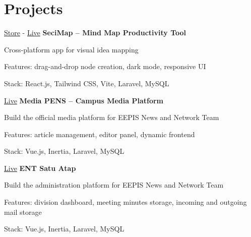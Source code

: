 \section{Projects}

\begin{twocolentrylink}{
		\href{https://play.google.com/store/apps/details?id=com.mindmap.mindmap&pcampaignid=web_share}{Store}
		-
		\href{https://secimap.agileteknik.com/}{Live}
	}
	\textbf{SeciMap -- Mind Map Productivity Tool}
\end{twocolentrylink}
\begin{onecolentry}
	\begin{highlights}
		\item Cross-platform app for visual idea mapping
		\item Features: drag-and-drop node creation, dark mode, responsive UI
		\item Stack: React.js, Tailwind CSS, Vite, Laravel, MySQL
	\end{highlights}
\end{onecolentry}

\vspace{0.3 cm}


\begin{twocolentrylink}{
		\href{https://media.ent.pens.ac.id}{Live}
	}
	\textbf{Media PENS -- Campus Media Platform}
\end{twocolentrylink}
\begin{onecolentry}
	\begin{highlights}
		\item Build the official media platform for EEPIS News and Network Team
		\item Features: article management, editor panel, dynamic frontend
		\item Stack: Vue.js, Inertia, Laravel, MySQL
	\end{highlights}
\end{onecolentry}

\vspace{0.3 cm}


\begin{twocolentrylink}{
		\href{https://ent.pens.ac.id}{Live}
	}
	\textbf{ENT Satu Atap}
\end{twocolentrylink}
\begin{onecolentry}
	\begin{highlights}
		\item Build the administration platform for EEPIS News and Network Team
		\item Features: division dashboard, meeting minutes storage, incoming and outgoing mail storage
		\item Stack: Vue.js, Inertia, Laravel, MySQL
	\end{highlights}
\end{onecolentry}

